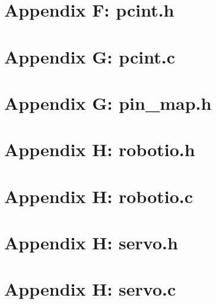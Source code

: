 \documentclass[letterpaper,11pt]{texMemo} %
\begin{document}
\section*{Appendix F: pcint.h}
\begin{tiny}

\end{tiny}
\newpage

\section*{Appendix G: pcint.c}
\begin{tiny}

\end{tiny}
\newpage

\section*{Appendix G: pin\_map.h}
\begin{tiny}

\end{tiny}
\newpage

\section*{Appendix H: robotio.h}
\begin{tiny}

\end{tiny}
\newpage

\section*{Appendix H: robotio.c}
\begin{tiny}

\end{tiny}
\newpage

\section*{Appendix H: servo.h}
\begin{tiny}

\end{tiny}
\newpage

\section*{Appendix H: servo.c}
\begin{tiny}

\end{tiny}
\newpage
\end{document}
